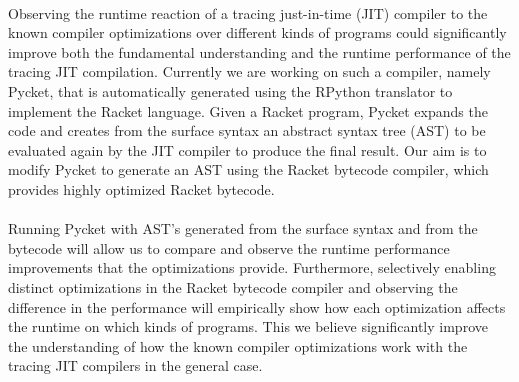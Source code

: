 \documentclass{article}
\begin{document}
\paragraph{} Observing the runtime reaction of a tracing just-in-time (JIT)
compiler to the known compiler optimizations over different kinds of
programs could significantly improve both the fundamental
understanding and the runtime performance of the tracing JIT
compilation. Currently we are working on such a compiler, namely
Pycket, that is automatically generated using the RPython translator
to implement the Racket language. Given a Racket program, Pycket
expands the code and creates from the surface syntax an abstract
syntax tree (AST) to be evaluated again by the JIT compiler to produce
the final result. Our aim is to modify Pycket to generate an AST using
the Racket bytecode compiler, which provides highly optimized Racket
bytecode.

\paragraph{} Running Pycket with AST's generated from the surface syntax and from
the bytecode will allow us to compare and observe the runtime
performance improvements that the optimizations provide. Furthermore,
selectively enabling distinct optimizations in the Racket bytecode
compiler and observing the difference in the performance will
empirically show how each optimization affects the runtime on which
kinds of programs. This we believe significantly improve the
understanding of how the known compiler optimizations work with the
tracing JIT compilers in the general case.





\end{document}
